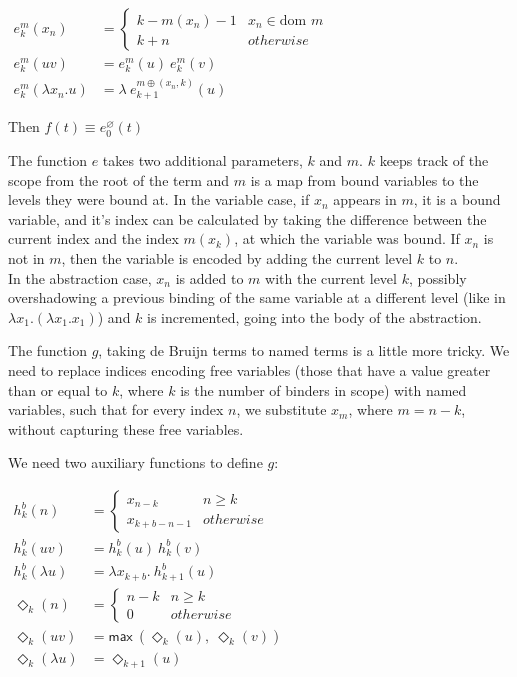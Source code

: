 \documentclass[a4paper, 12pt, twoside]{style/ociamthesis}
\theoremstyle{plain}
\theoremstyle{definition}
\theoremstyle{remark}
\renewcommand{\max}{\textsf{max}\ }
\let\emptyset\varnothing
\begin{document}
\begin{center}
$\begin{aligned}
e_k^m(x_n) &= \begin{cases}
k-m(x_n)-1 & x_n \in \text{dom }m\\
k+n & otherwise
\end{cases}\\
e_k^m(uv) &= e_k^m(u)\ e_k^m(v)\\
e_k^m(\lambda x_n.u) &= \lambda\ e_{k+1}^{m \oplus (x_n,k)}(u)
\end{aligned}$
\end{center}

Then \(f(t) \equiv e_0^\emptyset(t)\)

The function \(e\) takes two additional parameters, \(k\) and \(m\).
\(k\) keeps track of the scope from the root of the term and \(m\) is a
map from bound variables to the levels they were bound at. In the
variable case, if \(x_n\) appears in \(m\), it is a bound variable, and
it's index can be calculated by taking the difference between the
current index and the index \(m(x_k)\), at which the variable was bound.
If \(x_n\) is not in \(m\), then the variable is encoded by adding the
current level \(k\) to \(n\).\\
In the abstraction case, \(x_n\) is added to \(m\) with the current
level \(k\), possibly overshadowing a previous binding of the same
variable at a different level (like in
\(\lambda x_1. (\lambda x_1. x_1)\)) and \(k\) is incremented, going
into the body of the abstraction.

The function \(g\), taking de Bruijn terms to named terms is a little
more tricky. We need to replace indices encoding free variables (those
that have a value greater than or equal to \(k\), where \(k\) is the
number of binders in scope) with named variables, such that for every
index \(n\), we substitute \(x_m\), where \(m = n-k\), without capturing
these free variables.

We need two auxiliary functions to define \(g\):

\begin{center}
$\begin{aligned}
h_k^b(n) &= \begin{cases}
x_{n-k} & n \geq k\\
x_{k+b-n-1} & otherwise
\end{cases}\\
h_k^b(uv) &= h_k^b(u)\ h_k^b(v)\\
h_k^b(\lambda u) &= \lambda x_{k+b}.\ h_{k+1}^b(u)\\[2.5em]
\Diamond_k(n) &= \begin{cases}
n-k & n \geq k\\
0 & otherwise
\end{cases}\\
\Diamond_k(uv) &= \max (\Diamond_k(u),\ \Diamond_k(v))\\
\Diamond_k(\lambda u) &= \Diamond_{k+1}(u)
\end{aligned}$
\end{center}
\end{document}
